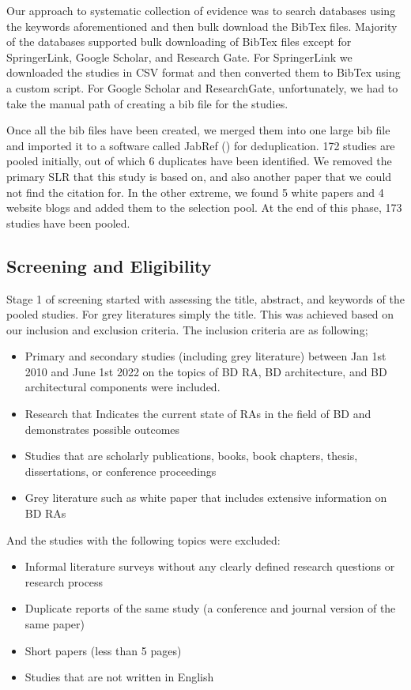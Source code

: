 \documentclass{ieeeaccess}
\begin{document}
Our approach to systematic collection of evidence was to search databases using the keywords aforementioned and then bulk download the BibTex files. Majority of the databases supported bulk downloading of BibTex files except for SpringerLink, Google Scholar, and Research Gate. For SpringerLink we downloaded the studies in CSV format and then converted them to BibTex using a custom script. For Google Scholar and ResearchGate, unfortunately, we had to take the manual path of creating a bib file for the studies. 

Once all the bib files have been created, we merged them into one large bib file and imported it to a software called JabRef (\cite{JabRef}) for deduplication. 172 studies are pooled initially, out of which 6 duplicates have been identified. We removed the primary SLR that this study is based on, and also another paper that we could not find the citation for. In the other extreme, we found 5 white papers and 4 website blogs and added them to the selection pool. At the end of this phase, 173 studies have been pooled. 

\subsection{Screening and Eligibility}

Stage 1 of screening started with assessing the title, abstract, and keywords of the pooled studies. For grey literatures simply the title. This was achieved based on our inclusion and exclusion criteria. The inclusion criteria are as following;

\begin{itemize}
    \item Primary and secondary studies (including grey literature) between Jan 1st 2010 and June 1st 2022 on the topics of BD RA, BD architecture, and BD architectural components were included. 
    \item Research that Indicates the current state of RAs in the field of BD and demonstrates possible outcomes
    \item Studies that are scholarly publications, books, book chapters, thesis, dissertations, or conference proceedings 
    \item Grey literature such as white paper that includes extensive information on BD RAs
\end{itemize}

And the studies with the following topics were excluded: 

\begin{itemize}
    \item Informal literature surveys without any clearly defined research questions or research process
    \item Duplicate reports of the same study (a conference and journal version of the same paper)
    \item Short papers (less than 5 pages)
    \item Studies that are not written in English
\end{itemize}
\end{document}
